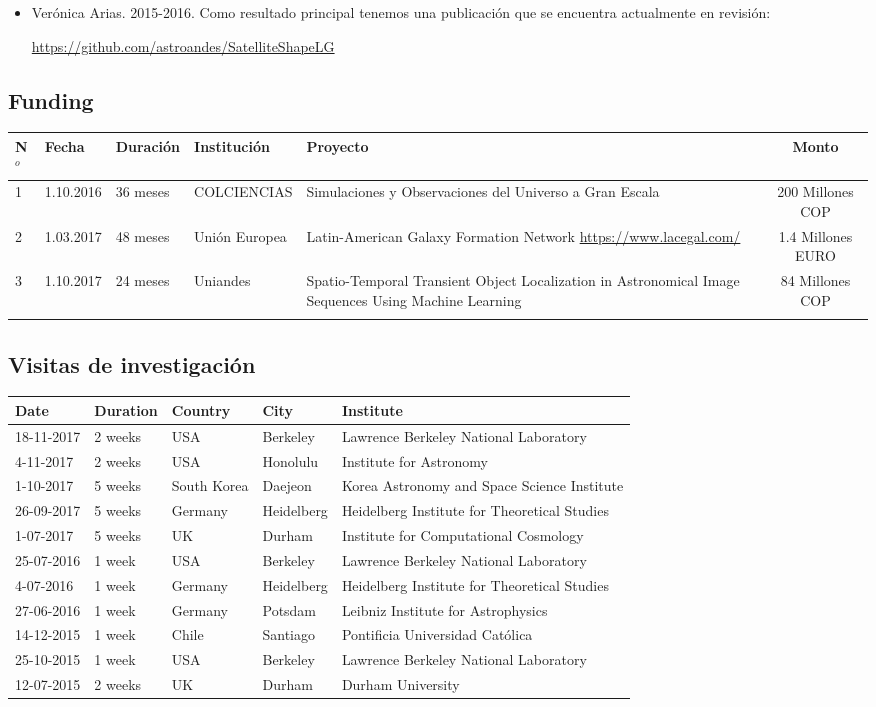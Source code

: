 \documentclass{article}
\begin{document}
\begin{itemize}
\item Ver\'onica Arias. 2015-2016. Como resultado principal tenemos
  una publicaci\'on que se encuentra actualmente en revisi\'on:

\url{https://github.com/astroandes/SatelliteShapeLG}

\end{itemize}


\subsection{Funding}
\begin{tabular}{l l l p{2.4cm} p{4.0cm} c}\hline
N$^{o}$ & Fecha & Duraci\'on & Instituci\'on & Proyecto & Monto \\\hline
1 & 1.10.2016 & 36 meses & COLCIENCIAS & Simulaciones y Observaciones del Universo a Gran Escala & 200 Millones COP\\\hline
2 & 1.03.2017 & 48 meses & Uni\'on Europea & Latin-American Galaxy Formation Network \url{https://www.lacegal.com/} & 1.4 Millones EURO \\\hline
3 & 1.10.2017 & 24 meses & Uniandes & 
Spatio-Temporal Transient Object Localization in Astronomical Image
Sequences Using Machine Learning & 84 Millones COP \\
\\\hline 
\end{tabular}

\subsection{Visitas de investigaci\'on}
\begin{tabular}{p{1.7cm} p{1.3cm} p{2.0cm} p{1.5cm} p{7.0cm}}\hline
Date & Duration & Country & City & Institute\\\hline
18-11-2017 & 2 weeks & USA & Berkeley & Lawrence Berkeley National Laboratory\\
4-11-2017 & 2 weeks & USA & Honolulu & Institute for Astronomy\\
1-10-2017 & 5 weeks & South Korea & Daejeon & Korea Astronomy and Space Science Institute \\
26-09-2017 & 5 weeks & Germany & Heidelberg & Heidelberg Institute for Theoretical Studies\\
1-07-2017 & 5 weeks & UK & Durham & Institute for Computational Cosmology\\
25-07-2016 & 1 week & USA & Berkeley & Lawrence Berkeley National Laboratory\\
4-07-2016 & 1 week & Germany & Heidelberg & Heidelberg Institute for Theoretical Studies \\
27-06-2016 & 1 week & Germany & Potsdam & Leibniz Institute for Astrophysics \\
14-12-2015 & 1 week & Chile & Santiago & Pontificia Universidad Cat\'olica\\
25-10-2015 & 1 week & USA & Berkeley & Lawrence Berkeley National Laboratory\\
12-07-2015 & 2 weeks & UK & Durham & Durham University\\\hline
\end{tabular}
\end{document}
